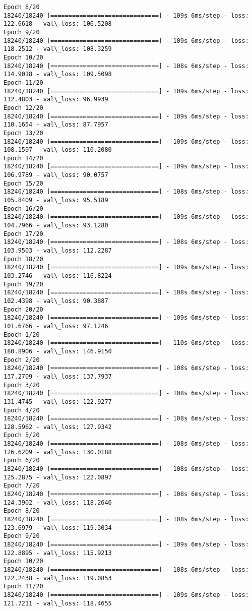 \documentclass[11pt]{article}
\begin{document}
\begin{Verbatim}[commandchars=\\\{\}]
Epoch 8/20
18240/18240 [==============================] - 109s 6ms/step - loss: 122.6618 - val\_loss: 106.5208
Epoch 9/20
18240/18240 [==============================] - 109s 6ms/step - loss: 118.2512 - val\_loss: 108.3259
Epoch 10/20
18240/18240 [==============================] - 108s 6ms/step - loss: 114.9018 - val\_loss: 109.5098
Epoch 11/20
18240/18240 [==============================] - 109s 6ms/step - loss: 112.4803 - val\_loss: 96.9939
Epoch 12/20
18240/18240 [==============================] - 109s 6ms/step - loss: 110.1654 - val\_loss: 87.7957
Epoch 13/20
18240/18240 [==============================] - 109s 6ms/step - loss: 108.1597 - val\_loss: 110.2080
Epoch 14/20
18240/18240 [==============================] - 109s 6ms/step - loss: 106.9789 - val\_loss: 90.0757
Epoch 15/20
18240/18240 [==============================] - 108s 6ms/step - loss: 105.8409 - val\_loss: 95.5189
Epoch 16/20
18240/18240 [==============================] - 109s 6ms/step - loss: 104.7966 - val\_loss: 93.1280
Epoch 17/20
18240/18240 [==============================] - 108s 6ms/step - loss: 103.9503 - val\_loss: 112.2287
Epoch 18/20
18240/18240 [==============================] - 109s 6ms/step - loss: 103.2746 - val\_loss: 116.8224
Epoch 19/20
18240/18240 [==============================] - 108s 6ms/step - loss: 102.4398 - val\_loss: 90.3887
Epoch 20/20
18240/18240 [==============================] - 109s 6ms/step - loss: 101.6766 - val\_loss: 97.1246
Epoch 1/20
18240/18240 [==============================] - 110s 6ms/step - loss: 180.8906 - val\_loss: 146.9150
Epoch 2/20
18240/18240 [==============================] - 108s 6ms/step - loss: 137.2709 - val\_loss: 137.7937
Epoch 3/20
18240/18240 [==============================] - 108s 6ms/step - loss: 131.4745 - val\_loss: 122.9277
Epoch 4/20
18240/18240 [==============================] - 108s 6ms/step - loss: 128.5962 - val\_loss: 127.9342
Epoch 5/20
18240/18240 [==============================] - 108s 6ms/step - loss: 126.6209 - val\_loss: 130.0188
Epoch 6/20
18240/18240 [==============================] - 108s 6ms/step - loss: 125.2875 - val\_loss: 122.0897
Epoch 7/20
18240/18240 [==============================] - 108s 6ms/step - loss: 124.3902 - val\_loss: 118.2646
Epoch 8/20
18240/18240 [==============================] - 108s 6ms/step - loss: 123.6979 - val\_loss: 119.3034
Epoch 9/20
18240/18240 [==============================] - 109s 6ms/step - loss: 122.8895 - val\_loss: 115.9213
Epoch 10/20
18240/18240 [==============================] - 108s 6ms/step - loss: 122.2438 - val\_loss: 119.0853
Epoch 11/20
18240/18240 [==============================] - 109s 6ms/step - loss: 121.7211 - val\_loss: 118.4655

\end{Verbatim}
\end{document}
